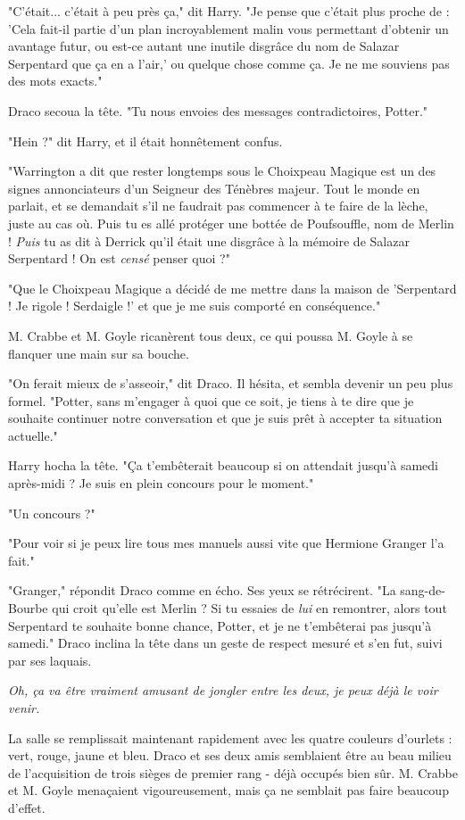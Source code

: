 "C'était... c'était à peu près ça," dit Harry. "Je pense que c'était plus proche de : 'Cela fait-il partie d'un plan incroyablement malin vous permettant d'obtenir un avantage futur, ou est-ce autant une inutile disgrâce du nom de Salazar Serpentard que ça en a l'air,' ou quelque chose comme ça. Je ne me souviens pas des mots exacts."

Draco secoua la tête. "Tu nous envoies des messages contradictoires, Potter."

"Hein ?" dit Harry, et il était honnêtement confus.

"Warrington a dit que rester longtemps sous le Choixpeau Magique est un des signes annonciateurs d'un Seigneur des Ténèbres majeur. Tout le monde en parlait, et se demandait s'il ne faudrait pas commencer à te faire de la lèche, juste au cas où. Puis tu es allé protéger une bottée de Poufsouffle, nom de Merlin ! \emph{Puis}  tu as dit à Derrick qu'il était une disgrâce à la mémoire de Salazar Serpentard ! On est \emph{censé}  penser quoi ?"

"Que le Choixpeau Magique a décidé de me mettre dans la maison de 'Serpentard ! Je rigole ! Serdaigle !' et que je me suis comporté en conséquence."

M. Crabbe et M. Goyle ricanèrent tous deux, ce qui poussa M. Goyle à se flanquer une main sur sa bouche.

"On ferait mieux de s'asseoir," dit Draco. Il hésita, et sembla devenir un peu plus formel. "Potter, sans m'engager à quoi que ce soit, je tiens à te dire que je souhaite continuer notre conversation et que je suis prêt à accepter ta situation actuelle."

Harry hocha la tête. "Ça t'embêterait beaucoup si on attendait jusqu'à samedi après-midi ? Je suis en plein concours pour le moment."

"Un concours ?"

"Pour voir si je peux lire tous mes manuels aussi vite que Hermione Granger l'a fait."

"Granger," répondit Draco comme en écho. Ses yeux se rétrécirent. "La sang-de-Bourbe qui croit qu'elle est Merlin ? Si tu essaies de \emph{lui}  en remontrer, alors tout Serpentard te souhaite bonne chance, Potter, et je ne t'embêterai pas jusqu'à samedi." Draco inclina la tête dans un geste de respect mesuré et s'en fut, suivi par ses laquais.

\emph{Oh, ça va être vraiment amusant de jongler entre les deux, je peux déjà le voir venir.} 

La salle se remplissait maintenant rapidement avec les quatre couleurs d'ourlets : vert, rouge, jaune et bleu. Draco et ses deux amis semblaient être au beau milieu de l'acquisition de trois sièges de premier rang - déjà occupés bien sûr. M. Crabbe et M. Goyle menaçaient vigoureusement, mais ça ne semblait pas faire beaucoup d'effet.

